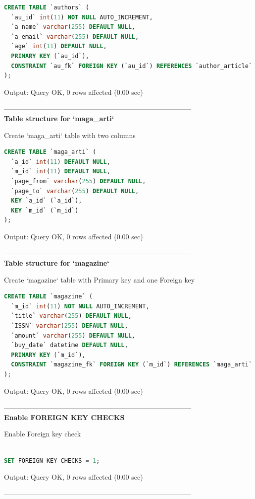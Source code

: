 \documentclass[12pt]{report}
\begin{document}
\begin{lstlisting}[language=sql]
CREATE TABLE `authors` (
  `au_id` int(11) NOT NULL AUTO_INCREMENT,
  `a_name` varchar(255) DEFAULT NULL,
  `a_email` varchar(255) DEFAULT NULL,
  `age` int(11) DEFAULT NULL,
  PRIMARY KEY (`au_id`),
  CONSTRAINT `au_fk` FOREIGN KEY (`au_id`) REFERENCES `author_article` (`au_id`) ON DELETE CASCADE ON UPDATE CASCADE
);
\end{lstlisting}

Output: Query OK, 0 rows affected (0.00 sec)

---------------------------------------------------------------------------------
\\
\textbf{Table structure for `maga\_arti`}

Create `maga\_arti` table with two columns

\begin{lstlisting}[language=sql]
CREATE TABLE `maga_arti` (
  `a_id` int(11) DEFAULT NULL,
  `m_id` int(11) DEFAULT NULL,
  `page_from` varchar(255) DEFAULT NULL,
  `page_to` varchar(255) DEFAULT NULL,
  KEY `a_id` (`a_id`),
  KEY `m_id` (`m_id`)
);
\end{lstlisting}

Output: Query OK, 0 rows affected (0.00 sec)

---------------------------------------------------------------------------------
\\
\textbf {Table structure for `magazine`}

Create `magazine` table with Primary key and one Foreign key 

\begin{lstlisting}[language=sql]
CREATE TABLE `magazine` (
  `m_id` int(11) NOT NULL AUTO_INCREMENT,
  `title` varchar(255) DEFAULT NULL,
  `ISSN` varchar(255) DEFAULT NULL,
  `amount` varchar(255) DEFAULT NULL,
  `buy_date` datetime DEFAULT NULL,
  PRIMARY KEY (`m_id`),
  CONSTRAINT `magazine_fk` FOREIGN KEY (`m_id`) REFERENCES `maga_arti` (`m_id`) ON DELETE CASCADE ON UPDATE CASCADE
);
\end{lstlisting}

Output: Query OK, 0 rows affected (0.00 sec)

---------------------------------------------------------------------------------\\
\textbf {Enable FOREIGN KEY CHECKS}

Enable Foreign key check
 
\begin{lstlisting}[language=sql]

SET FOREIGN_KEY_CHECKS = 1;
\end{lstlisting}

Output: Query OK, 0 rows affected (0.00 sec)

---------------------------------------------------------------------------------
\end{document}
